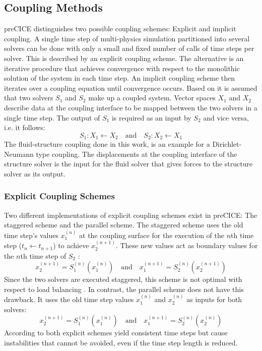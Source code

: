  \subsection{Coupling Methods}\label{sec:Coupl-Coupling}
  preCICE distinguishes two possible coupling schemes: Explicit and implicit coupling. A single time step of multi-physics simulation partitioned into several solvers can be done with only a small and fixed number of calls of time steps per solver. This is described by an explicit coupling scheme. The alternative is an iterative procedure that achieves convergence with respect to the monolithic solution of the system in each time step. An implicit coupling scheme then iterates over a coupling equation until convergence occurs. Based on \cite{bungartz2015fully} it is assumed that two solvers $S_1$ and $S_2$ make up a coupled system. Vector spaces $X_1$ and $X_2$ describe data at the coupling interface to be mapped between the two solvers in a single time step. The output of $S_1$ is required as an input by $S_2$ and vice versa, i.e. it follows:
  \begin{equation}
  S_1: X_1 \leftarrow X_2\quad \text{and}\quad S_2:X_2 \leftarrow X_1
  \end{equation}
  The fluid-structure coupling done in this work, is an example for a Dirichlet-Neumann type coupling. The displacements at the coupling interface of the structure solver is the input for the fluid solver that gives forces to the structure solver as its output.
 
  \subsubsection{Explicit Coupling Schemes}\label{sec:Coupl-Coupling-Explicit}
   Two different implementations of explicit coupling schemes exist in preCICE: The staggered scheme and the parallel scheme. The staggered scheme uses the old time step's values $x_1^{(n)}$ at the coupling surface for the execution of the $n$th time step ($t_n \leftarrow t_{n+1}$) to achieve $x_2^{(n+1)}$. These new values act as boundary values for the $n$th time step of $S_2$ \cite{bungartz2015fully}:
   \begin{equation}
   x_2^{(n+1)} = S_1^{(n)}\left( x_1^{(n)} \right)\quad \text{and}\quad x_1^{(n+1)} = S_2^{(n)}\left( x_2^{(n+1)} \right)
   \end{equation}
   Since the two solvers are executed staggered, this scheme is not optimal with respect to load balancing \cite{bungartz2015fully}. In contrast, the parallel scheme does not have this drawback. It uses the old time step values $x_1^{(n)}$ and $x_2^{(n)}$ as inputs for both solvers:
   \begin{equation}
   x_2^{(n+1)} = S_1^{(n)}\left( x_1^{(n)} \right)\quad \text{and}\quad x_1^{(n+1)} = S_2^{(n)}\left( x_2^{(n)} \right)
   \end{equation}
   According to \cite{bungartz2015fully} both explicit schemes yield consistent time steps but cause instabilities that cannot be avoided, even if the time step length is reduced.
  
